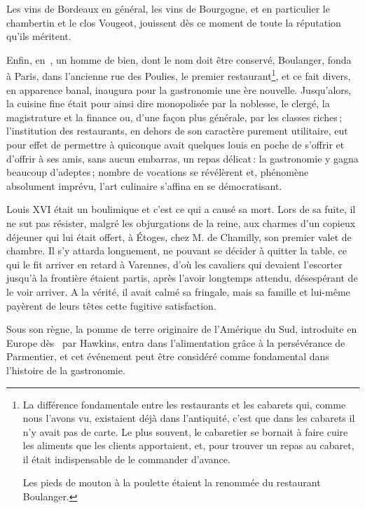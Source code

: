 Les vins de Bordeaux en général, les vins de Bourgogne, et en particulier le
chambertin et le clos Vougeot, jouissent dès ce moment de toute la réputation
qu'ils méritent.

Enfin, en {\mmm} {\mmm}, un homme de bien, dont le nom doit être
conservé, Boulanger, fonda à Paris, dans l’ancienne rue des Poulies, le premier
restaurant\footnote{La différence fondamentale entre les restaurants et les
cabarets qui, comme nous l'avons vu, existaient déjà dans l’antiquité, c'est
que dans les cabarets il n'y avait pas de carte. Le plus souvent, le cabaretier
se bornait à faire cuire les aliments que les clients apportaient, et, pour
trouver un repas au cabaret, il était indispensable de le commander d'avance.

Les pieds de mouton à la poulette étaient la renommée du restaurant
Boulanger.}, et ce fait divers, en apparence banal, inaugura pour la
gastronomie une ère nouvelle. Jusqu'alors, la cuisine fine était pour ainsi
dire monopolisée par la noblesse, le clergé, la magistrature et la finance ou,
d'une façon plus générale, par les classes riches ; l'institution des
restaurants, en dehors de son caractère purement utilitaire, eut pour effet de
permettre à quiconque avait quelques louis en poche de s'offrir et d'offrir
à ses amis, sans aucun embarras, un repas délicat : la gastronomie y gagna
beaucoup d'adeptes ; nombre de vocations se révélèrent et, phénomène absolument
imprévu, l'art culinaire s'affina en se démocratisant.

Louis XVI était un boulimique et c'est ce qui a causé sa mort. Lors de sa
fuite, il ne sut pas résister, malgré les objurgations de la reine, aux charmes
d'un copieux déjeuner qui lui était offert, à Étoges, chez M. de Chamilly, son
premier valet de chambre. Il s’y attarda longuement, ne pouvant se décider
à quitter la table, ce qui le fit arriver en retard à Varennes, d'où les
cavaliers qui devaient l'escorter jusqu'à la frontière étaient partis, après
l'avoir longtemps attendu, désespérant de le voir arriver. A la vérité, il
avait calmé sa fringale, mais sa famille et lui-même payèrent de leurs têtes
cette fugitive satisfaction.

Sous son règne, la pomme de terre originaire de l'Amérique du Sud, introduite
en Europe dès {\mmm} {\mmm} par Hawkins, entra dans l'alimentation
grâce à la persévérance de Parmentier, et cet événement peut être considéré
comme fondamental dans l'histoire de la gastronomie.

